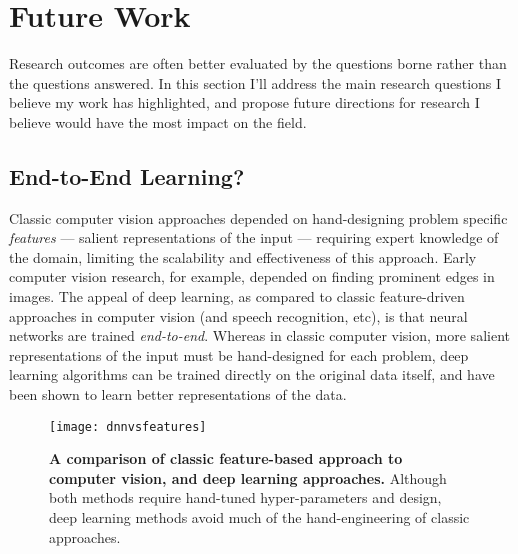 \documentclass[thesis]{subfiles}
\begin{document}

\chapter{Future Work}  %
\label{futurework}


Research outcomes are often better evaluated by the questions borne rather than the questions answered. In this section I'll address the main research questions I believe my work has highlighted, and propose future directions for research I believe would have the most impact on the field.

\section{End-to-End Learning?}
Classic computer vision approaches depended on hand-designing problem specific \emph{features} --- salient representations of the input --- requiring expert knowledge of the domain, limiting the scalability and effectiveness of this approach. Early computer vision research, for example, depended on finding prominent edges in images. The appeal of deep learning, as compared to classic feature-driven approaches in computer vision (and speech recognition, etc), is that neural networks are trained \emph{end-to-end}. Whereas in classic computer vision, more salient representations of the input must be hand-designed for each problem, deep learning algorithms can be trained directly on the original data itself, and have been shown to learn better representations of the data.

\begin{figure}[tbp]
	\centering
	\texttt{[image: dnnvsfeatures]}
	\caption[Classic feature-based approach \vs{}deep learning.]{\textbf{A comparison of classic feature-based approach to computer vision, and deep learning approaches.} Although both methods require hand-tuned hyper-parameters and design, deep learning methods avoid much of the hand-engineering of classic approaches.}\label{dnnvsfeatures}
\end{figure}
	
\end{document}
